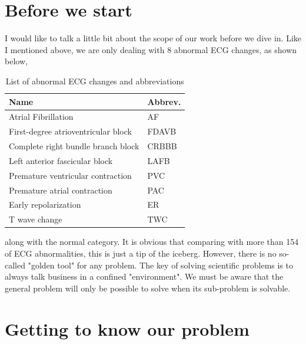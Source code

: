 \documentclass[runningheads]{llncs}
\begin{document}
\section{Before we start}
I would like to talk a little bit about the scope of our work before we dive in. Like I mentioned above, we are only dealing with 8 abnormal ECG changes, as shown below,
\begin{center}
	\begin{table}[H]
		\caption{\label{tab:table1}%
			List of abnormal ECG changes and abbreviations}
		\begin{tabular}{|l|l|}
			Name&Abbrev.\\
			\hline
			
			Atrial Fibrillation&AF\\
			First-degree atrioventricular block&FDAVB\\
			Complete right bundle branch block&CRBBB\\
			Left anterior fascicular block&LAFB\\
			Premature ventricular contraction&PVC\\
			Premature atrial contraction&PAC\\
			Early repolarization&ER\\
			T wave change&TWC\\
		\end{tabular}
	\end{table}
\end{center}

along with the normal category. It is obvious that comparing with more than 154 \cite{litfl} of ECG abnormalities, this is just a tip of the iceberg. 
However, there is no so-called "golden tool" for any problem. The key of solving scientific problems is to always talk business in a confined "environment". We must be aware that the general problem will only be possible to solve when its sub-problem is solvable. 

\section{Getting to know our problem}
\end{document}
